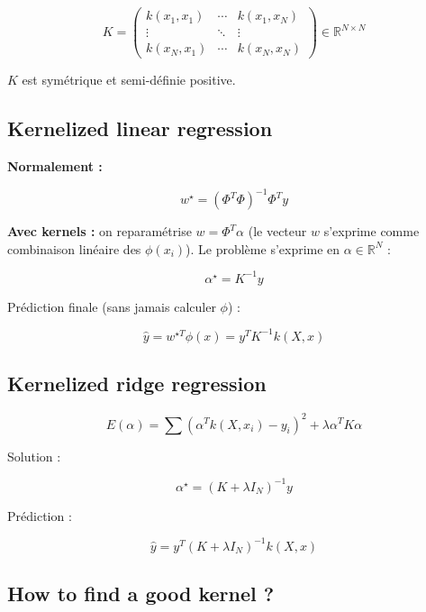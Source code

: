 \documentclass[11pt,a4paper,openany]{book}
\begin{document}
\[
K =
\begin{pmatrix}
k(x_1, x_1) & \cdots & k(x_1, x_N) \\
\vdots & \ddots & \vdots \\
k(x_N, x_1) & \cdots & k(x_N, x_N)
\end{pmatrix}
\in \mathbb{R}^{N \times N}
\]

$K$ est symétrique et semi-définie positive.

\vspace{1cm}

\subsection{Kernelized linear regression}

\textbf{Normalement :}

\[
w^\star
=
(\Phi^T \Phi)^{-1} \Phi^T y
\]

\textbf{Avec kernels :} on reparamétrise $w = \Phi^T \alpha$ (le vecteur $w$ s'exprime comme combinaison linéaire des $\phi(x_i)$). Le problème s'exprime en $\alpha \in \mathbb{R}^N$ :

\[
\alpha^\star = K^{-1} y
\]

\vspace{0.6cm}

Prédiction finale (sans jamais calculer $\phi$) :

\[
\hat{y}
=
w^{\star T} \phi(x)
=
y^T K^{-1} k(X, x)
\]

\vspace{1cm}

\subsection{Kernelized ridge regression}

\[
E(\alpha)
=
\sum (\alpha^T k(X, x_i) - y_i)^2
+
\lambda \alpha^T K \alpha
\]

\vspace{0.5cm}

Solution :

\[
\alpha^\star
=
(K + \lambda I_N)^{-1} y
\]

\vspace{0.5cm}

Prédiction :

\[
\hat{y}
=
y^T (K + \lambda I_N)^{-1} k(X, x)
\]

\vspace{1cm}

\subsection{How to find a good kernel ?}
\end{document}
